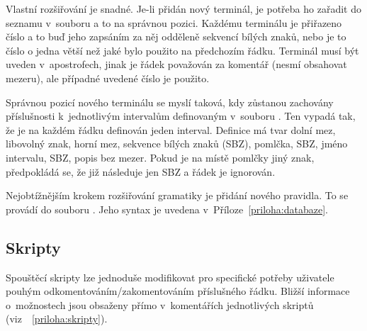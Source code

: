 Vlastní rozšiřování je snadné. Je-li přidán nový terminál, je potřeba ho
zařadit do seznamu v~souboru  a to na správnou pozici.
Každému terminálu je přiřazeno číslo a to buď jeho zapsáním za něj odděleně
sekvencí bílých znaků, nebo je to číslo o jedna větší než jaké bylo použito na
předchozím řádku. Terminál musí být uveden v~apostrofech, jinak je řádek
považován za komentář (nesmí obsahovat mezeru), ale případné uvedené číslo je
použito.

Správnou pozicí nového terminálu se myslí taková, kdy zůstanou zachovány
příslušnosti k~jednotlivým intervalům definovaným v~souboru
. Ten vypadá tak, že je na každém řádku definován jeden
interval. Definice má tvar dolní mez, libovolný znak, horní mez, sekvence bílých
znaků (SBZ), pomlčka, SBZ, jméno intervalu, SBZ, popis bez mezer. Pokud je na
místě pomlčky jiný znak, předpokládá se, že již následuje jen SBZ a řádek je
ignorován.

Nejobtížnějším krokem rozšiřování gramatiky je přidání nového pravidla. To se
provádí do souboru . Jeho syntax je uvedena
v~Pří\-lo\-ze~\ref{priloha:databaze}.

\subsection{Skripty}
Spouštěcí skripty lze jednoduše modifikovat pro specifické potřeby uživatele
pouhým odkomentováním/zakomentováním příslušného řádku. Bližší informace
o~možnostech jsou obsaženy přímo v~komentářích jednotlivých skriptů
(viz~{\appendixname}~\ref{priloha:skripty}).


